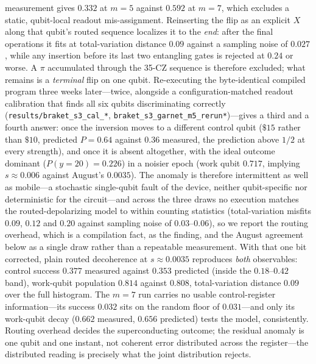 \documentclass[aps,pra,reprint,superscriptaddress,nofootinbib,floatfix]{revtex4-2}
\begin{document}
measurement gives $0.332$ at $m{=}5$ against $0.592$ at $m{=}7$,
which excludes a static, qubit-local readout mis-assignment.
Reinserting the flip as an explicit $X$ along that qubit's routed
sequence localizes it to the \emph{end}: after the final operations
it fits at total-variation distance $0.09$ against a sampling noise
of $0.027$, while any insertion before its last two entangling gates
is rejected at $0.24$ or worse. A $\pi$ accumulated through the
35-CZ sequence is therefore excluded; what remains is a
\emph{terminal} flip on one qubit. Re-executing the byte-identical
compiled program three weeks later---twice, alongside a
configuration-matched readout calibration that finds all six qubits
discriminating correctly
(\texttt{results/braket\_s3\_cal\_*},
\texttt{braket\_s3\_garnet\_m5\_rerun*})---gives a third and a
fourth answer: once the inversion moves to a different control qubit
($\$15$ rather than $\$10$, predicted $P{=}0.64$ against $0.36$
measured, the prediction above $1/2$ at every strength), and once it
is absent altogether, with the ideal outcome dominant
($P(y{=}20)=0.226$) in a noisier epoch (work qubit $0.717$, implying
$s\approx0.006$ against August's $0.0035$). The anomaly is therefore
intermittent as well as mobile---a stochastic single-qubit fault of
the device, neither qubit-specific nor deterministic for the
circuit---and across the three draws no execution matches the
routed-depolarizing model to within counting statistics
(total-variation misfits $0.09$, $0.12$ and $0.20$ against sampling
noise of $0.03$--$0.06$), so we report the routing overhead, which
is a compilation fact, as the finding, and the August agreement
below as a single draw rather than a repeatable measurement. With
that one bit corrected, plain routed
decoherence at $s\approx0.0035$ reproduces \emph{both} observables:
control success $0.377$ measured against $0.353$ predicted (inside
the $0.18$--$0.42$ band), work-qubit population $0.814$ against
$0.808$, total-variation distance $0.09$ over the full histogram.
The $m{=}7$ run carries no usable control-register information---its
success $0.032$ sits on the random floor of $0.031$---and only its
work-qubit decay ($0.662$ measured, $0.656$ predicted) tests the
model, consistently. Routing overhead decides the superconducting
outcome; the residual anomaly is one qubit and one instant, not
coherent error distributed across the register---the distributed
reading is precisely what the joint distribution rejects.
\end{document}
